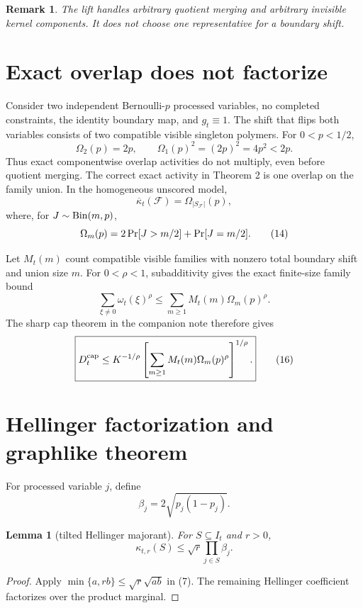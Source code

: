 \documentclass[11pt]{article}
\newtheorem{lemma}[theorem]{Lemma}
\newtheorem{remark}[theorem]{Remark}
\newcommand{\Prb}{\mathop{\rm Pr}}
\newcommand{\1}{\mathbf 1}
\begin{document}
\begin{remark}
The lift handles arbitrary quotient merging and arbitrary invisible kernel
components.  It does not choose one representative for a boundary shift.
\end{remark}

\section{Exact overlap does not factorize}

Consider two independent Bernoulli-\(p\) processed variables, no completed
constraints, the identity boundary map, and \(g_t\equiv1\).  The shift that
flips both variables consists of two compatible visible singleton polymers.
For \(0<p<1/2\),
\[
 \Omega_2(p)=2p,
 \qquad
 \Omega_1(p)^2=(2p)^2=4p^2<2p.
\tag{12}
\]
Thus exact componentwise overlap activities do not multiply, even before
quotient merging.  The correct exact activity in Theorem 2 is one overlap on
the family union.  In the homogeneous unscored model,
\[
\boxed{
 \overline\kappa_t(\mathcal F)
 =
 \Omega_{|S_{\mathcal F}|}(p),}
\tag{13}
\]
where, for \(J\sim{\rm Bin}(m,p)\),
\[
 \Omega_m(p)
 =
 2\Prb[J>m/2]+\Prb[J=m/2].
\tag{14}
\]

Let \(M_t(m)\) count compatible visible families with nonzero total boundary
shift and union size \(m\).  For \(0<\rho<1\), subadditivity gives the exact
finite-size family bound
\[
\boxed{
 \sum_{\xi\ne0}\omega_t(\xi)^\rho
 \le
 \sum_{m\ge1}M_t(m)\Omega_m(p)^\rho.}
\tag{15}
\]
The sharp cap theorem in the companion note therefore gives
\[
\boxed{
 D_t^{\rm cap}
 \le
 K^{-1/\rho}
 \left[
 \sum_{m\ge1}M_t(m)\Omega_m(p)^\rho
 \right]^{1/\rho}.}
\tag{16}
\]

\section{Hellinger factorization and graphlike theorem}

For processed variable \(j\), define
\[
 \beta_j=2\sqrt{p_j(1-p_j)}.
\tag{17}
\]

\begin{lemma}[tilted Hellinger majorant]
For \(S\subseteq I_t\) and \(r>0\),
\[
\boxed{
 \kappa_{t,r}(S)
 \le
 \sqrt r\prod_{j\in S}\beta_j.}
\tag{18}
\]
\end{lemma}

\begin{proof}
Apply \(\min\{a,rb\}\le\sqrt r\sqrt{ab}\) in (7).  The remaining
Hellinger coefficient factorizes over the product marginal.
\end{proof}
\end{document}
